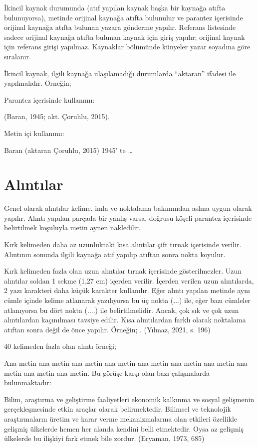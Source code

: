 İkincil kaynak durumunda (atıf yapılan kaynak başka bir kaynağa atıfta bulunuyorsa), metinde orijinal kaynağa atıfta bulunulur ve parantez içerisinde orijinal kaynağa atıfta bulunan yazara gönderme yapılır. Referans listesinde sadece orijinal kaynağa atıfta bulunan kaynak için giriş yapılır; orijinal kaynak için referans girişi yapılmaz. Kaynaklar bölümünde künyeler yazar soyadına göre sıralanır.

İkincil kaynak, ilgili kaynağa ulaşılamadığı durumlarda “aktaran” ifadesi ile yapılmalıdır. Örneğin;

Parantez içerisinde kullanımı:

(Baran, 1945; akt. Çoruhlu, 2015).

Metin içi kullanımı:

Baran (aktaran Çoruhlu, 2015) 1945’ te \ldots{}

\section{Alıntılar}
Genel olarak alıntılar kelime, imla ve noktalama bakımından aslına uygun olarak yapılır. Alıntı yapılan parçada bir yanlış varsa, doğrusu köşeli parantez içerisinde belirtilmek koşuluyla metin aynen nakledilir.

Kırk kelimeden daha az uzunluktaki kısa alıntılar çift tırnak içerisinde verilir. Alıntının sonunda ilgili kaynağa atıf yapılıp atıftan sonra nokta koyulur.

Kırk kelimeden fazla olan uzun alıntılar tırnak içerisinde gösterilmezler. Uzun alıntılar soldan 1 sekme (1,27 cm) içerden verilir. İçerden verilen uzun alıntılarda, 2 yazı karakteri daha küçük karakter kullanılır. Eğer alıntı yapılan metinde aynı cümle içinde kelime atlanarak yazılıyorsa bu üç nokta (...) ile, eğer bazı cümleler atlanıyorsa bu dört nokta (....) ile belirtilmelidir. Ancak, çok sık ve çok uzun alıntılardan kaçınılması tavsiye edilir. Kısa alıntılardan farklı olarak noktalama atıftan sonra değil de önce yapılır. Örneğin; . (Yılmaz, 2021, s. 196)

40 kelimeden fazla olan alıntı örneği;

Ana metin ana metin ana metin ana metin ana metin ana metin ana metin ana metin ana metin ana metin. Bu görüşe karşı olan bazı çalışmalarda bulunmaktadır:

\begin{alinti}
Bilim, araştırma ve geliştirme faaliyetleri ekonomik kalkınma ve sosyal gelişmenin gerçekleşmesinde etkin araçlar olarak belirmektedir. Bilimsel ve teknolojik araştırmaların üretim ve karar verme mekanizmalarına olan etkileri özellikle gelişmiş ülkelerde hemen her alanda kendini belli etmektedir. Oysa az gelişmiş ülkelerde bu ilişkiyi fark etmek bile zordur. (Eryaman, 1973, 685)
\end{alinti}


